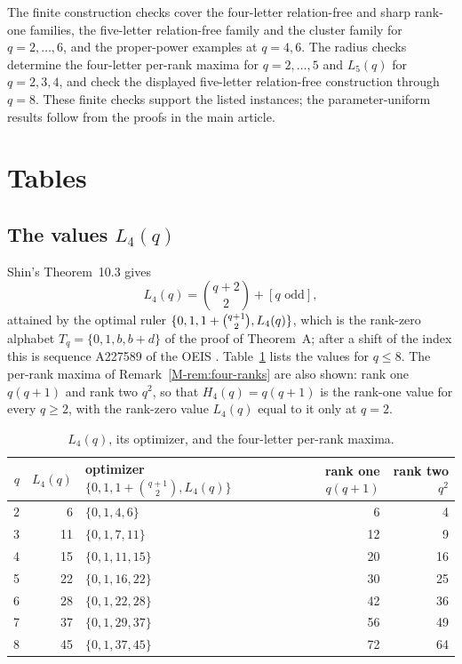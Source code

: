 \documentclass[11pt,reqno]{amsart}
\theoremstyle{plain}
\theoremstyle{definition}
\theoremstyle{plain}
\theoremstyle{plain}
\theoremstyle{plain}
\theoremstyle{plain}
\theoremstyle{plain}
\theoremstyle{plain}
\theoremstyle{definition}
\theoremstyle{definition}
\theoremstyle{definition}
\theoremstyle{plain}
\begin{document}
The finite construction checks cover the four-letter relation-free and
sharp rank-one families, the five-letter relation-free family and the
cluster family for $q=2,\ldots,6$, and the proper-power examples at $q=4,6$.
The radius checks determine the four-letter per-rank maxima for
$q=2,\ldots,5$ and $L_5(q)$ for $q=2,3,4$, and check the displayed
five-letter relation-free construction through $q=8$. These finite checks
support the listed instances; the parameter-uniform results follow from
the proofs in the main article.

\section{Tables}\label{S-supp:tables}

\subsection{The values \texorpdfstring{$L_4(q)$}{L4(q)}}
Shin's Theorem~10.3 \cite{S-Shin26} gives
\[
 L_4(q)=\binom{q+2}2+[q\text{ odd}],
\]
attained by the optimal ruler $\{0,1,1+\tbinom{q+1}2,L_4(q)\}$, which is
the rank-zero alphabet $T_q=\{0,1,b,b+d\}$ of the proof of Theorem~A; after
a shift of the index this is sequence A227589 of the OEIS \cite{S-OEIS}.
Table~\ref{S-tab:L4} lists the values for $q\le8$. The per-rank maxima of
Remark~\ref{M-rem:four-ranks} are also shown: rank one $q(q+1)$ and rank two $q^2$, so that
$H_4(q)=q(q+1)$ is the rank-one value for every $q\ge2$, with the rank-zero
value $L_4(q)$ equal to it only at $q=2$.

\begin{table}[htbp]
\caption{$L_4(q)$, its optimizer, and the four-letter per-rank maxima.}
\label{S-tab:L4}
\begin{center}\small
\begin{tabular}{@{}rrlrr@{}}
\toprule
$q$ & $L_4(q)$ & optimizer $\{0,1,1+\binom{q+1}2,L_4(q)\}$ & rank one $q(q+1)$ & rank two $q^2$\\
\midrule
2 & 6 & $\{0,1,4,6\}$ & 6 & 4\\
3 & 11 & $\{0,1,7,11\}$ & 12 & 9\\
4 & 15 & $\{0,1,11,15\}$ & 20 & 16\\
5 & 22 & $\{0,1,16,22\}$ & 30 & 25\\
6 & 28 & $\{0,1,22,28\}$ & 42 & 36\\
7 & 37 & $\{0,1,29,37\}$ & 56 & 49\\
8 & 45 & $\{0,1,37,45\}$ & 72 & 64\\
\bottomrule
\end{tabular}
\end{center}
\end{table}
\end{document}
